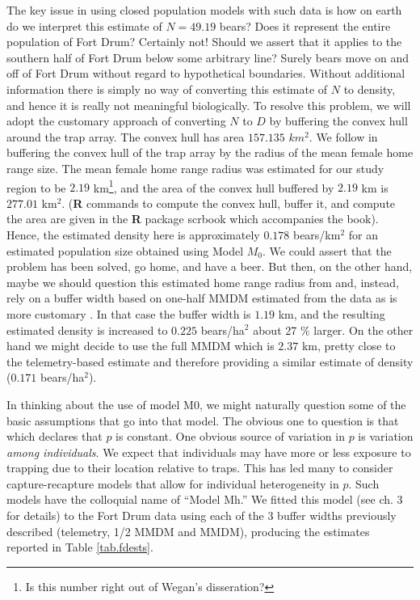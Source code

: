 The key issue in using closed population models with such data is how
on earth do we interpret this estimate of $N=49.19$ bears? Does it
represent the entire population of Fort Drum? Certainly not! Should we
assert that it applies to the southern half of Fort Drum below some
arbitrary line? Surely bears move on and off of Fort Drum without
regard to hypothetical boundaries. Without additional information
there is simply no way of converting this estimate of $N$ to density,
and hence it is really not meaningful biologically. To resolve this
problem, we will adopt the customary approach of converting $N$ to $D$
by buffering the convex hull around the trap array. The convex hull
has area $157.135$ $km^2$. We follow \citet{bales_etal:2005} in
buffering the convex hull of the trap array by the radius of the mean
female home range size. 
The mean female home range radius was
estimated \citep{wegan:2008} for our study region to be $2.19$
km\footnote{Is this number right out of Wegan's disseration?}, and
the area of the convex hull buffered by $2.19$ km is $277.01$
km$^2$. ({\bf R}
commands to compute the convex hull, buffer it, and compute the area
are given in the {\bf R} package \mbox{scrbook} which accompanies the
book).  Hence, the estimated density
here is approximately $0.178$ bears/km$^2$ for an estimated population
size obtained using Model $M_0$.  We could assert that the problem has
been solved, go home, and have a beer.  But then, on the other hand,
maybe we should question this estimated home range radius from
\citep{wegan:2008} and, instead, rely on a buffer width based on
one-half MMDM estimated from the data as is more customary
\citep{dice:1938}. In that case the buffer width is $1.19$ km, and the
resulting estimated density is increased to $0.225$ bears/ha$^2$ about
27 \% larger.  On the other hand we might decide to use the full MMDM
\citep{parmenter_etal:2003}
which is $2.37$ km, pretty close to the telemetry-based estimate
and therefore providing a similar estimate of density ($0.171$ bears/ha$^2$).

In thinking about the use of model M0, we might naturally question
some of the basic assumptions that go into that model. The obvious one
to question is that which declares that $p$ is constant. One obvious
source of variation in $p$ is variation {\it among individuals}. We
expect that individuals may have more or less exposure to trapping due
to their location relative to traps. This has led many to consider
capture-recapture models that allow for individual heterogeneity in
$p$. Such models have the colloquial name of ``Model Mh.''
We fitted this model (see ch. 3 for details) to the Fort Drum data
using each of the 3 buffer widths previously described (telemetry, 1/2
MMDM and MMDM), producing the estimates reported in Table
\ref{tab.fdests}.

